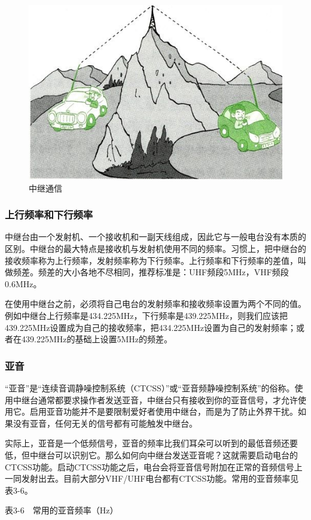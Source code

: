 \documentclass[12pt,UTF8]{ctexbook}
\begin{document}
\begin{figure}[htbp]
	\centering
	\includegraphics[width=0.7\linewidth]{38}
	\caption{中继通信}
	\label{fig:1}
\end{figure}

\subsubsection{上行频率和下行频率}

中继台由一个发射机、一个接收机和一副天线组成，因此它与一般电台没有本质的区别。中继台的最大特点是接收机与发射机使用不同的频率。习惯上，把中继台的接收频率称为上行频率，发射频率称为下行频率。上行频率和下行频率的差值，叫做频差。频差的大小各地不尽相同，推荐标准是：UHF频段5MHz，VHF频段0.6MHz。

在使用中继台之前，必须将自己电台的发射频率和接收频率设置为两个不同的值。例如中继台上行频率是434.225MHz，下行频率是439.225MHz，则我们应该把439.225MHz设置成为自己的接收频率，把434.225MHz设置为自己的发射频率；或者在439.225MHz的基础上设置5MHz的频差。

\subsubsection{亚音}

“亚音”是“连续音调静噪控制系统（CTCSS）”或“亚音频静噪控制系统”的俗称。使用中继台通常都要求操作者发送亚音，中继台只有接收到你的亚音信号，才允许使用它。启用亚音功能并不是要限制爱好者使用中继台，而是为了防止外界干扰。如果没有亚音，任何无关的信号都有可能触发中继台。

实际上，亚音是一个低频信号，亚音的频率比我们耳朵可以听到的最低音频还要低，但中继台可以识别它。那么如何向中继台发送亚音呢？这就需要启动电台的CTCSS功能。启动CTCSS功能之后，电台会将亚音信号附加在正常的音频信号上一同发射出去。目前大部分VHF/UHF电台都有CTCSS功能。常用的亚音频率见表3-6。

表3-6　常用的亚音频率（Hz）
\end{document}
